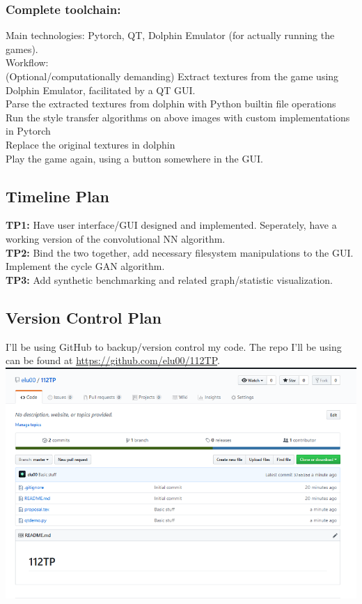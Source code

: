 \documentclass[12pt]{article}
\begin{document}
    \subsubsection{Complete toolchain:}
    Main technologies: Pytorch, QT, Dolphin Emulator (for actually running the games). \\
    Workflow: \\
    (Optional/computationally demanding) Extract textures from the game using Dolphin Emulator, facilitated by a QT GUI. \\
    Parse the extracted textures from dolphin with Python builtin file operations \\
    Run the style transfer algorithms on above images with custom implementations in Pytorch \\
    Replace the original textures in dolphin \\
    Play the game again, using a button somewhere in the GUI. \\

\subsection{Timeline Plan}
    \textbf{TP1:} Have user interface/GUI designed and implemented. Seperately, have a working version of the convolutional NN algorithm.\\
    \textbf{TP2:} Bind the two together, add necessary filesystem manipulations to the GUI. Implement the cycle GAN algorithm.\\
    \textbf{TP3:} Add synthetic benchmarking and related graph/statistic visualization.\\
\subsection{Version Control Plan}
    I'll be using GitHub to backup/version control my code. 
    The repo I'll be using can be found at \href{https://github.com/elu00/112TP}{https://github.com/elu00/112TP}. \\
    \includegraphics[scale=0.8]{screenshot.png}
\end{document}
